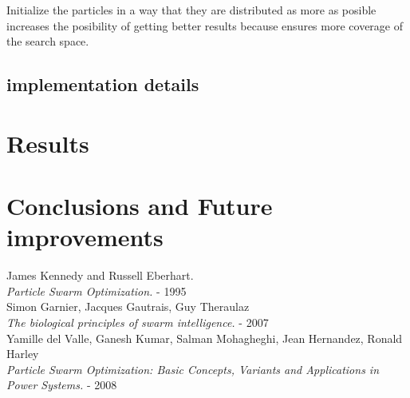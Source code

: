 \documentclass[journal]{IEEEtran}
\begin{document}
Initialize the particles in a way that they are distributed as more as posible increases the posibility of getting better results because ensures more coverage of the search space.
\subsection{implementation details} %

\section{Results}


\section{Conclusions and Future improvements}



\begin{thebibliography}{1}

  James Kennedy and Russell Eberhart. \\
  \textit{Particle Swarm Optimization.} - 1995
\\
  Simon Garnier, Jacques Gautrais, Guy Theraulaz\\
  \textit{The biological principles of swarm intelligence.} - 2007
\\
  Yamille del Valle, Ganesh Kumar, Salman Mohagheghi, Jean Hernandez, Ronald Harley\\
  \textit{Particle Swarm Optimization: Basic Concepts, Variants and Applications in Power Systems.} - 2008

\end{thebibliography}
\end{document}
